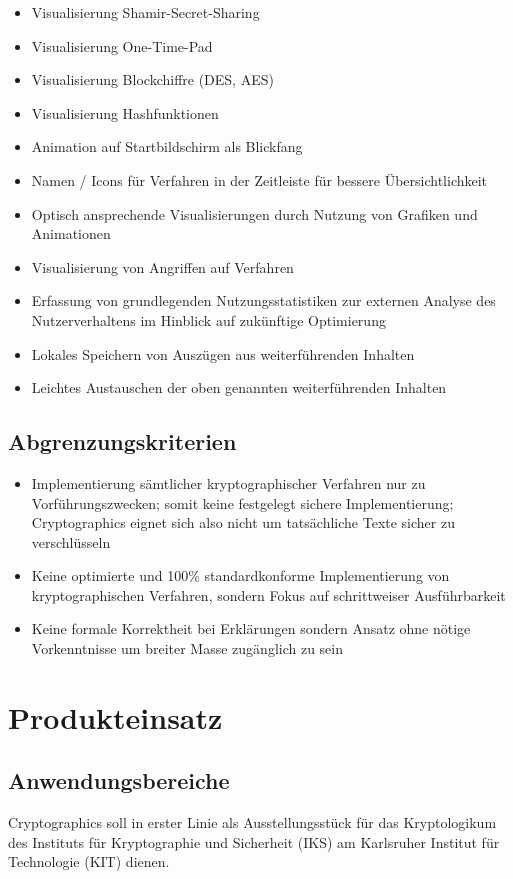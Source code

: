 \documentclass{article}
\begin{document}
\begin{itemize}
    \item Visualisierung Shamir-Secret-Sharing
    \item Visualisierung One-Time-Pad
    \item Visualisierung Blockchiffre (DES, AES)
    \item Visualisierung Hashfunktionen
    \item Animation auf Startbildschirm als Blickfang
    \item Namen / Icons für Verfahren in der Zeitleiste für bessere Übersichtlichkeit
    \item Optisch ansprechende Visualisierungen durch Nutzung von Grafiken und Animationen
    \item Visualisierung von Angriffen auf Verfahren
    \item Erfassung von grundlegenden Nutzungsstatistiken zur externen Analyse des Nutzerverhaltens im Hinblick auf zukünftige Optimierung
    \item Lokales Speichern von Auszügen aus weiterführenden Inhalten
    \item Leichtes Austauschen der oben genannten weiterführenden Inhalten
\end{itemize}

\subsection{Abgrenzungskriterien}
\begin{itemize}
	\item Implementierung sämtlicher kryptographischer Verfahren nur zu Vorführungszwecken; somit keine festgelegt sichere Implementierung; Cryptographics eignet sich also nicht um tatsächliche Texte sicher zu verschlüsseln
    \item Keine optimierte und 100\% standardkonforme Implementierung von kryptographischen Verfahren,
        sondern Fokus auf schrittweiser Ausführbarkeit
    \item Keine formale Korrektheit bei Erklärungen sondern Ansatz ohne nötige Vorkenntnisse
        um breiter Masse zugänglich zu sein
\end{itemize}

\section{Produkteinsatz}
\subsection{Anwendungsbereiche}
\gls{Cryptographics} soll in erster Linie als Ausstellungsstück für das \gls{Kryptologikum} des Instituts für Kryptographie und Sicherheit (\gls{IKS}) am Karlsruher Institut für Technologie (\gls{KIT}) dienen.
\end{document}
